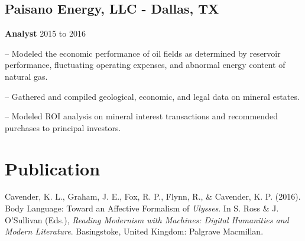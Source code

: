 \documentclass[12pt]{cavender_cv}
\begin{document}
\begin{minipage}[t]{0.65\textwidth}
\subsecspace

\subsection{Paisano Energy, LLC - Dallas, TX}
\textbf{Analyst} \hfill 2015 to 2016
\begin{hangparas}{.25in}{1}

-- Modeled the economic performance of oil fields 
as determined by reservoir performance, fluctuating
operating expenses, and abnormal energy content of 
natural gas.

-- Gathered and compiled geological, economic, and 
legal data on mineral estates.

-- Modeled ROI analysis on mineral interest 
transactions and recommended purchases to principal 
investors.

\end{hangparas}
\subsecspace

\section{Publication}
Cavender, K. L., Graham, J. E., Fox, R. P., Flynn, 
R., \& Cavender, K. P. (2016). Body Language: 
Toward an Affective Formalism of \textit{Ulysses}. 
In S. Ross \& J. O’Sullivan (Eds.), \textit{Reading 
Modernism with Machines: Digital Humanities 
and Modern Literature}. Basingstoke, United Kingdom: 
Palgrave Macmillan. 
\subsecspace

\end{minipage}%
\end{document}
